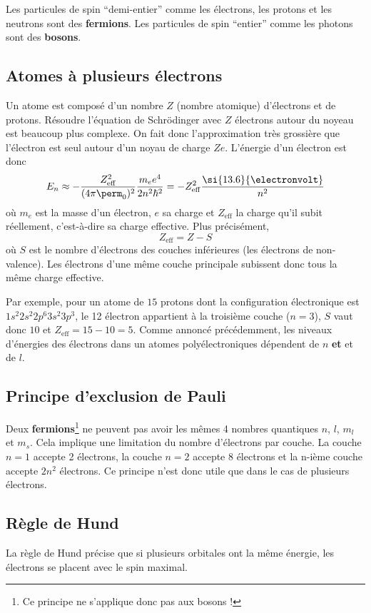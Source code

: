\begin{myrem}
	Les particules de spin ``demi-entier'' comme les
	électrons, les protons et les neutrons sont des \textbf{fermions}.
	Les particules de spin ``entier'' comme les photons sont
	des \textbf{bosons}.
\end{myrem}

\subsection{Atomes à plusieurs électrons}
Un atome est composé d'un nombre $Z$ (nombre atomique)
d'électrons et de protons. Résoudre l'équation de Schrödinger
avec $Z$ électrons autour du noyeau est beaucoup plus complexe.
On fait donc l'approximation très grossière que l'électron
est seul autour d'un noyau de charge $Ze$.
L'énergie d'un électron est donc
\[ E_n \approx -\frac{Z_\mathrm{eff}^2}{(4\pi\perm_0)^2}\frac{m_ee^4}{2n^2\hbar^2}
= -Z_\mathrm{eff}^2\frac{\si{13.6}{\electronvolt}}{n^2} \]
où $m_e$ est la masse d'un électron, $e$ sa charge et
$Z_\mathrm{eff}$ la charge qu'il subit réellement,
c'est-à-dire sa charge effective.
Plus précisément, 
\[ Z_\mathrm{eff} = Z - S \] 
où $S$ est le nombre d'électrons des couches inférieures (les électrons de non-valence).
Les électrons d'une même couche principale subissent donc tous la même charge effective.

Par exemple, pour un atome de $15$ protons dont la configuration 
électronique est $1s^2 2s^2 2p^6 3s^2 3p^3$, le 12\ieme{} électron
appartient à la troisième couche ($n=3$), $S$ vaut donc $10$ et 
$Z_\mathrm{eff} = 15 - 10 = 5$. Comme annoncé précédemment,
les niveaux d'énergies des électrons dans un atomes polyélectroniques
dépendent de $n$ \textbf{et} et de $l$.

\subsection{Principe d'exclusion de Pauli}
Deux \textbf{fermions}\footnote{Ce principe ne s'applique
donc pas aux bosons !} ne peuvent pas avoir les mêmes 4 nombres quantiques
$n$, $l$, $m_l$ et $m_s$. Cela implique une limitation du nombre
d'électrons par couche. La couche $n=1$ accepte 2 électrons,
la couche $n=2$ accepte 8 électrons et la n-ième couche
accepte $2n^2$ électrons.
Ce principe n'est donc utile que dans le cas de plusieurs électrons.

\subsection{Règle de Hund}
La règle de Hund précise que si plusieurs
orbitales ont la même énergie, les électrons
se placent avec le spin maximal.

